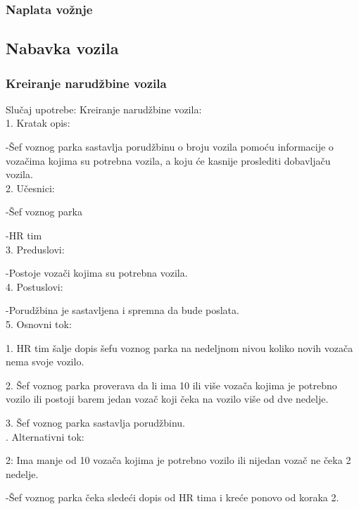 \subsubsection{\bfseries Naplata vo\v znje}

\newpage

\subsection{\bfseries Nabavka vozila}

\subsubsection{\bfseries Kreiranje narudžbine vozila}
\noindent Slučaj upotrebe: Kreiranje narudžbine vozila:\\
1. Kratak opis:
\par -Šef voznog parka sastavlja porudžbinu o broju vozila pomoću informacije o vozačima kojima su potrebna vozila, a koju će kasnije proslediti dobavljaču vozila.\\
2. Učesnici:
\par -Šef voznog parka
\par -HR tim\\
3. Preduslovi:
\par -Postoje vozači kojima su potrebna vozila.\\
4. Postuslovi:
\par -Porudžbina je sastavljena i spremna da bude poslata.\\
5. Osnovni tok:
\par 1. HR tim šalje dopis šefu voznog parka na nedeljnom nivou koliko novih vozača nema svoje vozilo.
\par 2. Šef voznog parka proverava da li ima 10 ili više vozača kojima je potrebno vozilo ili postoji barem jedan vozač koji čeka na vozilo više od dve nedelje.
\par 3. Šef voznog parka sastavlja porudžbinu.\\

. Alternativni tok:
\par 2: Ima manje od 10 vozača kojima je potrebno vozilo ili nijedan vozač ne čeka 2 nedelje.
\par -Šef voznog parka čeka sledeći dopis od HR tima i kreće ponovo od koraka 2.

